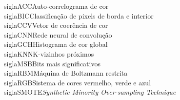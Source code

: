 sigla{ACC}{Auto-correlograma de cor}\\
sigla{BIC}{Classificação de pixels de borda e interior}\\
sigla{CCV}{Vetor de coerência de cor}\\
sigla{CNN}{Rede neural de convolução}\\
sigla{GCH}{Histograma de cor global}\\
sigla{KNN}{K-vizinhos próximos}\\
sigla{MSB}{Bits mais significativos}\\
sigla{RBM}{Máquina de Boltzmann restrita}\\
sigla{RGB}{Sistema de cores vermelho, verde e azul}\\
sigla{SMOTE}{\textit{Synthetic Minority Over-sampling Technique}} \\
